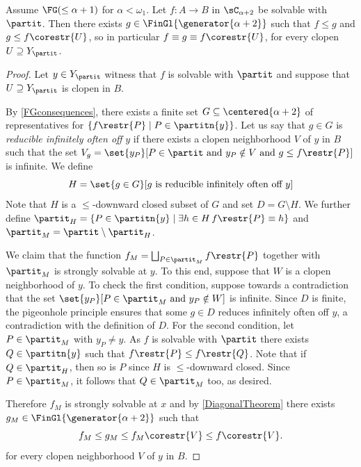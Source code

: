 \begin{theorem}\label{FiniteGenerationForSolvable}
Assume $\FG(\leq\alpha+1)$ for $\alpha<\omega_1$. Let $f:A \to B$ in $\sC_{\alpha+2}$ be solvable with $\partit$.
Then there exists $g\in \FinGl{\generator{\alpha+2}}$ such that $f\leq g$ and $g\leq f\corestr{U}$, so in particular $f\equiv g \equiv f\corestr{U}$, for every clopen $U\supseteq Y_\partit$.
\end{theorem}
\begin{proof}
Let $y\in Y_\partit$ witness that $f$ is solvable with $\partit$ and suppose that $U\supseteq Y_\partit$ is clopen in $B$.

By \cref{FGconsequences}, there exists a finite set $G\subseteq \centered{\alpha+2}$ of representatives for $\{f\restr{P}\mid P\in \partitn{y}\}$.
Let us say that $g\in G$ is \emph{reducible infinitely often off} $y$ if there exists a clopen neighborhood $V$ of $y$ in $B$
such that the set $V_g=\set{y_P}[P\in\partit \text{ and }y_P\notin V \text{ and }g\leq f\restr{P}]$ is infinite. We define
\[
H=\set{g\in G}[\text{$g$ is reducible infinitely often off $y$}]
\]
Note that $H$ is a $\leq$-downward closed subset of $G$ and set $D=G\setminus H$.
We further define $\partit_H=\{P\in\partitn{y}\mid \exists h\in H\,  f\restr{P}\equiv h\}$ and $\partit_M=\partit\setminus \partit_H$. 

We claim that the function $f_M=\bigsqcup_{P\in \partit_M}f\restr{P}$ together with $\partit_M$ is strongly solvable at $y$.
To this end, suppose that $W$ is a clopen neighborhood of $y$.
To check the first condition, suppose towards a contradiction that the set $\set{y_P}[P\in\partit_M \text{ and } y_P\notin W]$ is infinite.
Since $D$ is finite, the pigeonhole principle ensures that some $g\in D$ reduces infinitely often off $y$, a contradiction with the definition of $D$.
For the second condition, let $P\in\partit_M$ with $y_P\neq y$.
As $f$ is solvable with $\partit$ there exists $Q\in \partitn{y}$ such that $f\restr{P}\leq f\restr{Q}$.
Note that if $Q\in \partit_H$, then so is $P$ since $H$ is $\leq$-downward closed. Since $P\in \partit_M$, it follows that $Q\in \partit_M$ too, as desired.

Therefore $f_M$ is strongly solvable at $x$ and by \cref{DiagonalTheorem} there exists $g_M\in\FinGl{\generator{\alpha+2}}$ such that
\[
f_M \leq g_M \leq f_M\corestr{V}\leq f\corestr{V}.
\]
for every clopen neighborhood $V$ of $y$ in $B$. 


\end{proof}
